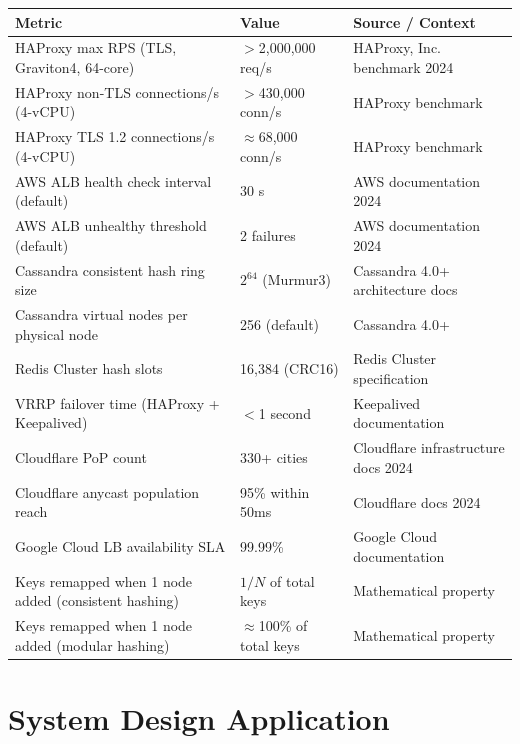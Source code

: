 \documentclass[11pt,a4paper]{article}
\begin{document}
\medskip
\begin{tabularx}{\linewidth}{@{}lXX@{}}
  \toprule
  \textbf{Metric} & \textbf{Value} & \textbf{Source / Context} \\
  \midrule
  HAProxy max RPS (TLS, Graviton4, 64-core) & $>$2,000,000 req/s & HAProxy, Inc. benchmark 2024 \\
  \addlinespace
  HAProxy non-TLS connections/s (4-vCPU) & $>$430,000 conn/s & HAProxy benchmark \\
  \addlinespace
  HAProxy TLS 1.2 connections/s (4-vCPU) & $\approx$68,000 conn/s & HAProxy benchmark \\
  \addlinespace
  AWS ALB health check interval (default) & 30 s & AWS documentation 2024 \\
  \addlinespace
  AWS ALB unhealthy threshold (default) & 2 failures & AWS documentation 2024 \\
  \addlinespace
  Cassandra consistent hash ring size & $2^{64}$ (Murmur3) & Cassandra 4.0+ architecture docs \\
  \addlinespace
  Cassandra virtual nodes per physical node & 256 (default) & Cassandra 4.0+ \\
  \addlinespace
  Redis Cluster hash slots & 16,384 (CRC16) & Redis Cluster specification \\
  \addlinespace
  VRRP failover time (HAProxy + Keepalived) & $<$1 second & Keepalived documentation \\
  \addlinespace
  Cloudflare PoP count & 330+ cities & Cloudflare infrastructure docs 2024 \\
  \addlinespace
  Cloudflare anycast population reach & 95\% within 50ms & Cloudflare docs 2024 \\
  \addlinespace
  Google Cloud LB availability SLA & 99.99\% & Google Cloud documentation \\
  \addlinespace
  Keys remapped when 1 node added (consistent hashing) & $1/N$ of total keys & Mathematical property \\
  \addlinespace
  Keys remapped when 1 node added (modular hashing) & $\approx$100\% of total keys & Mathematical property \\
  \bottomrule
\end{tabularx}
\medskip

\section{System Design Application}
\end{document}
